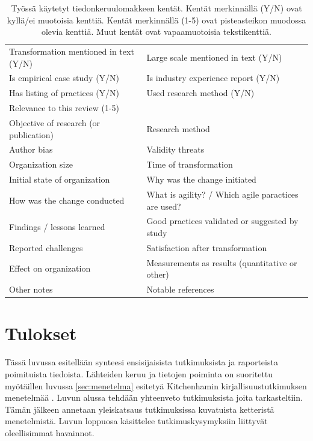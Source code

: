 \begin{table}
    \begin{tabular}{| l | p{7.64cm} |}
        \hline
        Transformation mentioned in text (Y/N) &
        Large scale mentioned in text (Y/N) \\
        Is empirical case study (Y/N) &
        Is industry experience report (Y/N) \\
        Has listing of practices (Y/N) &
        Used research method (Y/N) \\
        Relevance to this review (1-5) & \\
        Objective of research (or publication) &
        Research method \\
        Author bias &
        Validity threats \\
        Organization size &
        Time of transformation \\
        Initial state of organization &
        Why was the change initiated \\
        How was the change conducted &
        What is agility? / Which agile paractices are used? \\
        Findings / lessons learned &
        Good practices validated or suggested by study \\
        Reported challenges &
        Satisfaction after transformation \\
        Effect on organization &
        Measurements as results (quantitative or other) \\
        Other notes &
        Notable references \\
        \hline
    \end{tabular}
    \caption{Työssä käytetyt tiedonkeruulomakkeen kentät. Kentät merkinnällä
    (Y/N) ovat kyllä/ei muotoisia kenttiä. Kentät merkinnällä (1-5) ovat
    pisteasteikon muodossa olevia kenttiä. Muut kentät ovat vapaamuotoisia
    tekstikenttiä.}
    \label{table:dataform}
\end{table}


\clearpage
\section{Tulokset}
\label{sec:tulokset}

Tässä luvussa esitellään synteesi ensisijaisista tutkimuksista ja raporteista
poimituista tiedoista. Lähteiden keruu ja tietojen poiminta on suoritettu
myötäillen luvussa \ref{sec:menetelma} esitetyä Kitchenhamin
kirjallisuustutkimuksen menetelmää . Luvun alussa
tehdään yhteenveto tutkimuksista joita tarkasteltiin. Tämän jälkeen annetaan
yleiskatsaus tutkimuksissa kuvatuista ketteristä menetelmistä. Luvun loppuosa
käsittelee tutkimuskysymyksiin liittyvät oleellisimmat havainnot.


